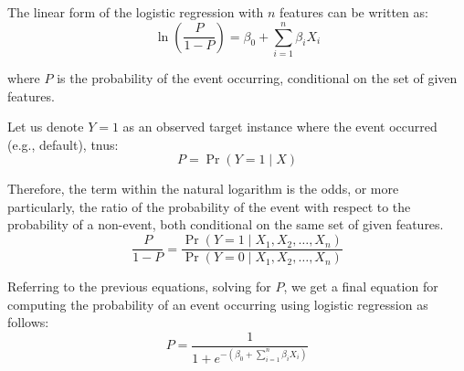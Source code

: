 The linear form of the logistic regression with $n$ features can be written as:
\begin{equation}\label{eq}
    \ln\left(\frac{P}{1-P}\right) = \beta_0  + \sum_{i=1}^{n} \beta_i X_i
\end{equation}

where $P$ is the probability of the event occurring, conditional on the set of given features.


Let us denote $Y=1$ as an observed target instance where the event occurred (e.g., default), tnus:
\begin{equation}\label{eq}
    P = \operatorname{Pr}(Y=1 \mid X)
\end{equation}

Therefore, the term within the natural logarithm is the odds, or more particularly, the ratio of the probability of the event with respect to the probability of a non-event, both conditional on the same set of given features.
\begin{equation}\label{eq}
    \frac{P}{1-P}  = \frac{\operatorname{Pr}(Y=1 \mid X_1,X_2,\ldots,X_n)}{\operatorname{Pr}(Y=0 \mid X_1,X_2,\ldots,X_n)}
\end{equation}

Referring to the previous equations, solving for $P$, we get a final equation for computing the probability of an event occurring using logistic regression as follows:
\begin{equation}\label{eq}
P = \frac{1}{1+e^{-\left(\beta_0 + \sum_{i=1}^{n} \beta_i X_i\right)}}
\end{equation}

